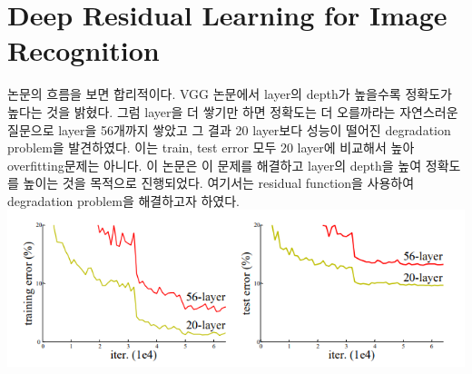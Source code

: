 \documentclass[extendedabs]{bmvc2k}
\begin{document}
\section{Deep Residual Learning for Image Recognition}
논문의 흐름을 보면 합리적이다. VGG 논문에서 layer의 depth가 높을수록 정확도가 높다는 것을 밝혔다. 그럼 layer을 더 쌓기만 하면 정확도는 더 오를까라는 자연스러운 질문으로
layer을 56개까지 쌓았고 그 결과 20 layer보다 성능이 떨어진 degradation problem을 발견하였다. 이는 train, test error 모두 20 layer에 비교해서 높아 overfitting문제는 아니다. 이 논문은
이 문제를 해결하고 layer의 depth을 높여 정확도를 높이는 것을 목적으로 진행되었다. 여기서는 residual function을 사용하여 degradation problem을 해결하고자 하였다.
 \newline  \includegraphics[width=\linewidth]{images/09_residual.PNG}
\end{document}
